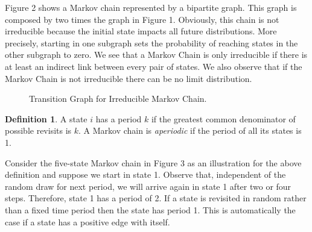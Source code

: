 \documentclass[12pt,english,a4paper,oneside]{article}
\theoremstyle{definition}
\newtheorem{definition}{Definition}[section]
\theoremstyle{definition}
\theoremstyle{definition}
\theoremstyle{definition}
\theoremstyle{remark}
\begin{document}
\noindent
Figure 2 shows a Markov chain represented by a bipartite graph. This graph is composed by two times the graph in Figure 1. Obviously, this chain is not irreducible because the initial state impacts all future distributions. More precisely, starting in one subgraph sets the probability of reaching states in the other subgraph to zero. We see that a Markov Chain is only irreducible if there is at least an indirect link between every pair of states. We also observe that if the Markov Chain is not irreducible there can be no limit distribution.

\begin{figure}[H]
\label{fig:ex2}
\centering


\caption{Transition Graph for Irreducible Markov Chain.}

\end{figure}

\begin{definition}
A state $i$ has a period $k$ if the greatest common denominator of possible revisits is $k$. A Markov chain is \textit{aperiodic} if the period of all its states is 1.
\end{definition}

\noindent
Consider the five-state Markov chain in Figure 3 as an illustration for the above definition and suppose we start in state 1. Observe that, independent of the random draw for next period, we will arrive again in state 1 after two or four steps. Therefore, state 1 has a period of 2. If a state is revisited in random rather than a fixed time period then the state has period 1. This is automatically the case if a state has a positive edge with itself.
\end{document}
